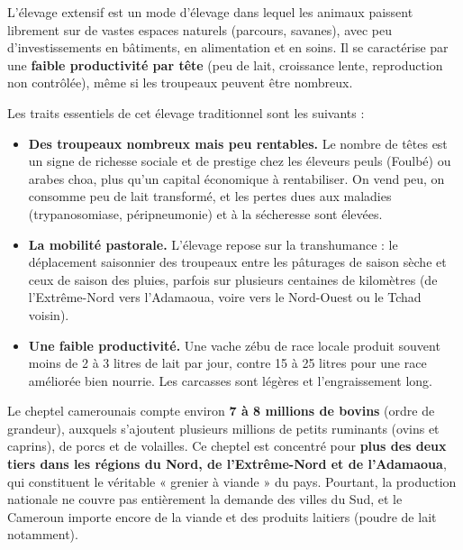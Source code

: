 \documentclass[11pt]{article}
\newcommand{\cle}[1]{{\popxbold\color{popdark}#1}}
\begin{document}
\begin{definition}
L'\cle{élevage extensif} est un mode d'élevage dans lequel les animaux paissent librement sur de vastes espaces naturels (parcours, savanes), avec peu d'investissements en bâtiments, en alimentation et en soins. Il se caractérise par une \textbf{faible productivité par tête} (peu de lait, croissance lente, reproduction non contrôlée), même si les troupeaux peuvent être nombreux.
\end{definition}

Les traits essentiels de cet élevage traditionnel sont les suivants :

\begin{itemize}
\item \textbf{Des troupeaux nombreux mais peu rentables.} Le nombre de têtes est un signe de richesse sociale et de prestige chez les éleveurs peuls (Foulbé) ou arabes choa, plus qu'un capital économique à rentabiliser. On vend peu, on consomme peu de lait transformé, et les pertes dues aux maladies (trypanosomiase, péripneumonie) et à la sécheresse sont élevées.
\item \textbf{La mobilité pastorale.} L'élevage repose sur la \cle{transhumance} : le déplacement saisonnier des troupeaux entre les pâturages de saison sèche et ceux de saison des pluies, parfois sur plusieurs centaines de kilomètres (de l'Extrême-Nord vers l'Adamaoua, voire vers le Nord-Ouest ou le Tchad voisin).
\item \textbf{Une faible productivité.} Une vache zébu de race locale produit souvent moins de 2 à 3 litres de lait par jour, contre 15 à 25 litres pour une race améliorée bien nourrie. Les carcasses sont légères et l'engraissement long.
\end{itemize}

\begin{exemplebox}
Le cheptel camerounais compte environ \textbf{7 à 8 millions de bovins} (ordre de grandeur), auxquels s'ajoutent plusieurs millions de petits ruminants (ovins et caprins), de porcs et de volailles. Ce cheptel est concentré pour \textbf{plus des deux tiers dans les régions du Nord, de l'Extrême-Nord et de l'Adamaoua}, qui constituent le véritable « grenier à viande » du pays. Pourtant, la production nationale ne couvre pas entièrement la demande des villes du Sud, et le Cameroun importe encore de la viande et des produits laitiers (poudre de lait notamment).
\end{exemplebox}
\end{document}
